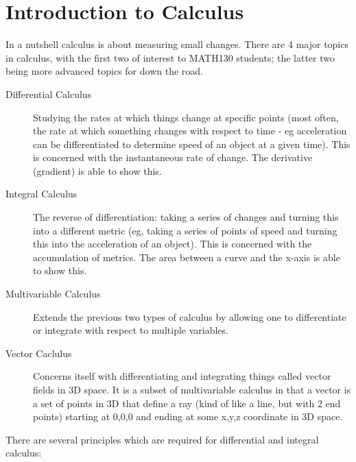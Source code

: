 \chapter{Introduction to Calculus}
\label{chap:IntroductionToCalculus}
In a nutshell calculus is about measuring small changes. There are 4 major
topics in calculus, with the first two of interest to MATH130 students; the
latter two being more advanced topics for down the road.
\begin{description}
  \item[Differential Calculus] Studying the rates at which things change at
  specific points (most often, the rate at which something changes with respect
  to time - eg acceleration can be differentiated to determine speed of an
  object at a given time). This is concerned with the instantaneous rate of
  change. The derivative (gradient) is able to show this. 
  
  \item[Integral Calculus] The reverse of differentiation: taking a series of
  changes and turning this into a different metric (eg, taking a series of
  points of speed and turning this into the acceleration of an object). This is
  concerned with the accumulation of metrics. The area between a curve and the
  x-axis is able to show this.
  
  \item[Multivariable Calculus] Extends the previous two types of calculus by
  allowing one to differentiate or integrate with respect to multiple variables.
  
  \item[Vector Caclulus] Concerns itself with differentiating and integrating
  things called vector fields in 3D space. It is a subset of multivariable
  calculus in that a vector is a set of points in 3D that define a ray (kind of
  like a line, but with 2 end points) starting at 0,0,0 and ending at some x,y,z
  coordinate in 3D space.
\end{description}
There are several principles which are required for differential and integral
calculus:
